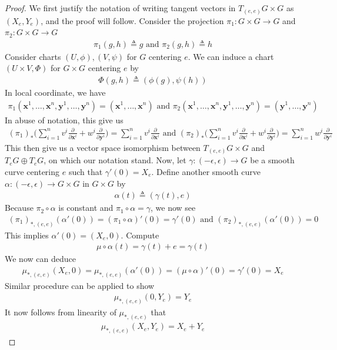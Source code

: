 \documentclass{report}
\begin{document}
\begin{proof}
We first justify the notation of writing tangent vectors in $T_{(e,e)}G\times G$ as $(X_e,Y_e)$, and the proof will follow. Consider the projection $\pi_1:G\times G\rightarrow G$ and $\pi_2:G\times G\rightarrow G$ 
\begin{align*}
\pi_1(g,h)\triangleq g\text{ and }\pi_2(g,h)\triangleq h  
\end{align*}
Consider charts $(U,\phi),(V,\psi)$ for $G$ centering  $e$. We can induce a chart $(U\times V,\Phi)$ for $G\times G$ centering $e$ by 
 \begin{align*}
\Phi (g,h)\triangleq (\phi (g),\psi(h))
\end{align*}
In local coordinate, we have 
\begin{align*}
\pi_1(\textbf{x}^1,\dots ,\textbf{x}^n,\textbf{y}^1,\dots ,\textbf{y}^n)=(\textbf{x}^1,\dots ,\textbf{x}^n)\text{ and }\pi_2(\textbf{x}^1,\dots ,\textbf{x}^n,\textbf{y}^1,\dots ,\textbf{y}^n)=(\textbf{y}^1,\dots ,\textbf{y}^n)
\end{align*}
In abuse of notation, this give us 
\begin{align*}
  (\pi_1)_*\Big(\sum_{i=1}^n v^i \frac{\partial }{\partial \textbf{x}^i}+ w^i \frac{\partial }{\partial \textbf{y}^i}\Big)= \sum_{i=1}^n v^i \frac{\partial }{\partial \textbf{x}^i}\text{ and }  (\pi_2)_*\Big(\sum_{i=1}^n v^i \frac{\partial }{\partial \textbf{x}^i}+ w^i \frac{\partial }{\partial \textbf{y}^i}\Big)= \sum_{i=1}^n w^i \frac{\partial }{\partial \textbf{y}^i}
\end{align*}
This then give us a vector space isomorphism between $T_{(e,e)}G\times G$ and $T_eG \oplus T_eG$, on which our notation stand. Now, let $\gamma  :(-\epsilon  ,\epsilon  )\rightarrow G$ be a smooth curve centering  $e$ such that  $\gamma '(0)=X_e$. Define another smooth curve $\alpha :(-\epsilon  ,\epsilon )\rightarrow G\times G$ in $G\times G$ by 
\begin{align*}
\alpha (t)\triangleq (\gamma (t),e)
\end{align*}
Because $\pi_2 \circ \alpha $ is constant and $\pi_1 \circ \alpha =\gamma  $, we now see 
\begin{align*}
  (\pi_1)_{*,(e,e)}(\alpha '(0))=(\pi_1 \circ \alpha )'(0)=\gamma  '(0) \text{ and } (\pi_2)_{*,(e,e)}(\alpha '(0))= 0
\end{align*}
This implies $\alpha '(0)=(X_e,0)$. Compute 
\begin{align*}
\mu \circ \alpha (t)=\gamma (t)+e=\gamma  (t)
\end{align*}
We now can deduce
\begin{align*}
\mu_{*,(e,e)}(X_e,0)=\mu_{*,(e,e)}(\alpha '(0))=(\mu \circ \alpha )'(0)=\gamma '(0)= X_e
\end{align*}
Similar procedure can be applied to show 
\begin{align*}
\mu_{*,(e,e)}(0,Y_e)=Y_e
\end{align*}
It now follows from linearity of  $\mu_{*,(e,e)}$ that 
\begin{align*}
\mu_{*,(e,e)}(X_e,Y_e)=X_e+Y_e
\end{align*}
\end{proof}
\end{document}
